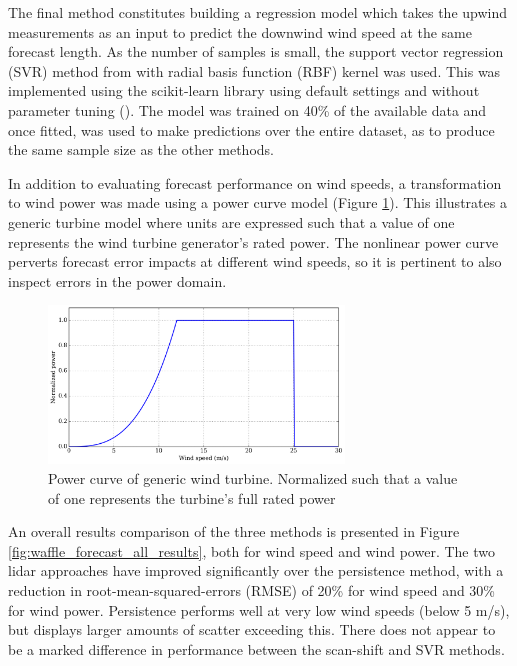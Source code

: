 The final method constitutes building a regression model which takes the upwind measurements as an input to predict the downwind wind speed at the same forecast length. As the number of samples is small, the support vector regression (SVR) method from \cite{drucker_svr_1996} with radial basis function (RBF) kernel was used. This was implemented using the scikit-learn library using default settings and without parameter tuning (\cite{sklearn_svr_docs}). The model was trained on 40\% of the available data and once fitted, was used to make predictions over the entire dataset, as to produce the same sample size as the other methods.

In addition to evaluating forecast performance on wind speeds, a transformation to wind power was made using a power curve model (Figure \ref{fig:waffle_power_curve}). This illustrates a generic turbine model where units are expressed such that a value of one represents the wind turbine generator's rated power. The nonlinear power curve perverts forecast error impacts at different wind speeds, so it is pertinent to also inspect errors in the power domain.

\begin{figure}[htbp]
    \centering
        \includegraphics[width=0.7\textwidth]{graphics/results/waffle/power_curve.png}
    \caption{Power curve of generic wind turbine. Normalized such that a value of one represents the turbine's full rated power}
    \label{fig:waffle_power_curve}
\end{figure}

An overall results comparison of the three methods is presented in Figure \ref{fig:waffle_forecast_all_results}, both for wind speed and wind power. The two lidar approaches have improved significantly over the persistence method, with a reduction in root-mean-squared-errors (RMSE) of 20\% for wind speed and 30\% for wind power. Persistence performs well at very low wind speeds (below 5 m/s), but displays larger amounts of scatter exceeding this. There does not appear to be a marked difference in performance between the scan-shift and SVR methods.

